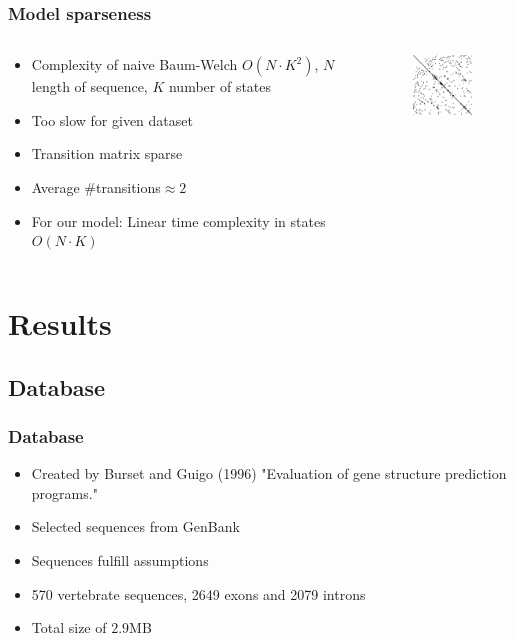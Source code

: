 \documentclass{beamer}[12pt]
\begin{document}
\begin{frame}
	\frametitle{Model sparseness}
	\begin{columns}
		\begin{column}{6.5cm}
			\begin{itemize}
				\item Complexity of naive Baum-Welch $O(N\cdot K^2)$, $N$ length of sequence, $K$ number of states
				\item Too slow for given dataset
				\item Transition matrix sparse
				\item Average $\#$transitions$\approx 2$
				\item For our model: Linear time complexity in states $O(N\cdot K)$
			\end{itemize}
		\end{column}
		\begin{column}{4.5cm}
			\begin{figure}
				\includegraphics[width=4cm]{../picturesforthepresentation/sparse.png}
			\end{figure}
		\end{column}
	\end{columns}
\end{frame}

\section{Results}
\subsection{Database}
\begin{frame}
	\frametitle{Database}
	\begin{itemize}
		\item Created by Burset and Guigo (1996) "Evaluation of gene structure prediction programs."
		\item Selected sequences from GenBank
		\item Sequences fulfill assumptions
		\item 570 vertebrate sequences, 2649 exons and 2079 introns
		\item Total size of $2.9$MB
	\end{itemize}
\end{frame}
\end{document}
